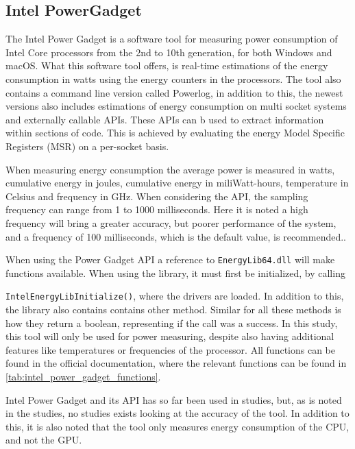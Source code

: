 \subsection{Intel PowerGadget}

The Intel Power Gadget\cite[]{powergadget} is a software tool for measuring power consumption of Intel Core processors from the 2nd to 10th generation, for both Windows and macOS. What this software tool offers, is real-time estimations of the energy consumption in watts using the energy counters in the processors. 
The tool also contains a command line version called Powerlog, in addition to this, the newest versions also includes estimations of energy consumption on multi socket systems and externally callable APIs. These APIs can b used to extract information within sections of code. This is achieved by evaluating the energy Model Specific Registers (MSR) on a per-socket basis.

When measuring energy consumption the average power is measured in watts, cumulative energy in joules, cumulative energy in miliWatt-hours, temperature in Celsius and frequency in GHz. When considering the API, the sampling frequency can range from 1 to 1000 milliseconds. Here it is noted a high frequency will bring a greater accuracy, but poorer performance of the system, and a frequency of 100 milliseconds, which is the default value, is recommended.\cite*[]{powergadget_api}.

When using the Power Gadget API a reference to \texttt{EnergyLib64.dll} will make functions available. When using the library, it must first be initialized, by calling 

\texttt{IntelEnergyLibInitialize()}, where the drivers are loaded. In addition to this, the library also contains contains other method. Similar for all these methods is how they return a boolean, representing if the call was a success. In this study, this tool will only be used for power measuring, despite also having additional features like temperatures or frequencies of the processor. All functions can be found in the official documentation\cite*[]{powergadget_api}, where the relevant functions can be found in \cref{tab:intel_power_gadget_functions}.

Intel Power Gadget and its API has so far been used in studies\cite[]{Bruce2015ReducingEC, Ozturk2019, Unlu2021}, but, as is noted in the studies, no studies exists looking at the accuracy of the tool. In addition to this, it is also noted that the tool only measures energy consumption of the CPU, and not the GPU.

